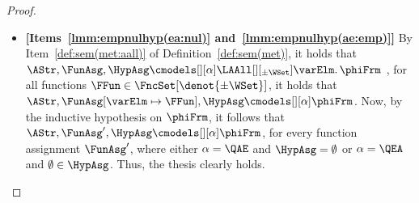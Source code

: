 \documentclass[authoryear]{elsarticle}
\newcommand{\EmpTeamAsg}{\emptyset}
\newcommand{\EmpHypAsg}{\emptyset}
\begin{document}
\begin{proof}
\begin{itemize}[$\bullet$]
\begin{itemize}
          By Item~\ref{def:sem(met:aall)} of Definition~\ref{def:sem(met)}, it
          holds that $\AStr, \FunAsg, \HypAsg \notcmodels[][\alpha]
          \LAAll[][_{\pm\WSet}] \varElm \ldotp \phiFrm$ \iff there exists a
          function $\FFun \in \FncSet[\denot{\pm\WSet}]{}$ such that $\AStr,
          {\FunAsg}[\varElm \mapsto \FFun], \HypAsg \notcmodels[][\alpha]
          \phiFrm$.
          Now, by the inductive hypothesis on $\phiFrm$, it follows that $\AStr,
          \FunAsg', \HypAsg \notcmodels[][\alpha] \phiFrm$, for every function
          assignment $\FunAsg'$, where either $\alpha = \QEA$ and $\HypAsg =
          \EmpHypAsg$ or $\alpha = \QAE$ and $\EmpTeamAsg \in \HypAsg$.
          Thus, the thesis clearly holds.
        \item\textbf{[Items~\ref{lmm:empnulhyp(ea:nul)}
          and~\ref{lmm:empnulhyp(ae:emp)}]}
          By Item~\ref{def:sem(met:aall)} of Definition~\ref{def:sem(met)}, it
          holds that $\AStr, \FunAsg, \HypAsg \cmodels[][\alpha]
          \LAAll[][_{\pm\WSet}] \varElm \ldotp \phiFrm$ \iff, for all functions
          $\FFun \in \FncSet[\denot{\pm\WSet}]{}$, it holds that $\AStr,
          {\FunAsg}[\varElm \mapsto \FFun], \HypAsg \cmodels[][\alpha]
          \phiFrm$.
          Now, by the inductive hypothesis on $\phiFrm$, it follows that $\AStr,
          \FunAsg', \HypAsg \cmodels[][\alpha] \phiFrm$, for every function
          assignment $\FunAsg'$, where either $\alpha = \QAE$ and $\HypAsg =
          \EmpHypAsg$ or $\alpha = \QEA$ and $\EmpTeamAsg \in \HypAsg$.
          Thus, the thesis clearly holds.
          \qedhere
      \end{itemize}
  \end{itemize}
\end{proof}
\end{document}
